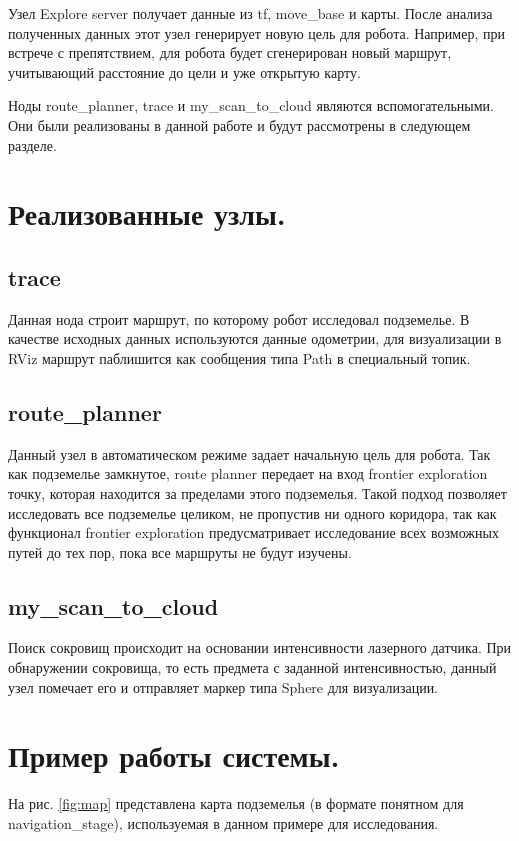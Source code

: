 \documentclass[14pt, a4paper]{extarticle}
\begin{document}
	Узел Explore server получает данные из tf, move\_base и карты. После анализа полученных данных этот узел генерирует новую цель для робота. Например, при встрече с препятствием, для робота будет сгенерирован новый маршрут, учитывающий расстояние до цели и уже открытую карту.
	
	Ноды route\_planner, trace и my\_scan\_to\_cloud являются вспомогательными. Они были реализованы в данной работе и будут рассмотрены в следующем разделе.
	
	\section{Реализованные узлы.}
	\subsection{trace}
	Данная нода строит маршрут, по которому робот исследовал подземелье. В качестве исходных данных используются данные одометрии, для визуализации в RViz маршрут паблишится как сообщения типа Path в специальный топик.
	
	\subsection{route\_planner}
	Данный узел в автоматическом режиме задает начальную цель для робота. Так как подземелье замкнутое, route planner передает на вход frontier exploration точку, которая находится за пределами этого подземелья. Такой подход позволяет исследовать все подземелье целиком, не пропустив ни одного коридора, так как функционал frontier exploration предусматривает исследование всех возможных путей до тех пор, пока все маршруты не будут изучены.
	
	\subsection{my\_scan\_to\_cloud}
	Поиск сокровищ происходит на основании интенсивности лазерного датчика. При обнаружении сокровища, то есть предмета с заданной интенсивностью, данный узел помечает его и отправляет маркер типа Sphere для визуализации.
	
	\section{Пример работы системы.}
	На рис. \ref{fig:map} представлена карта подземелья (в формате понятном для navigation\_stage), используемая в данном примере для исследования.
	
\end{document}
